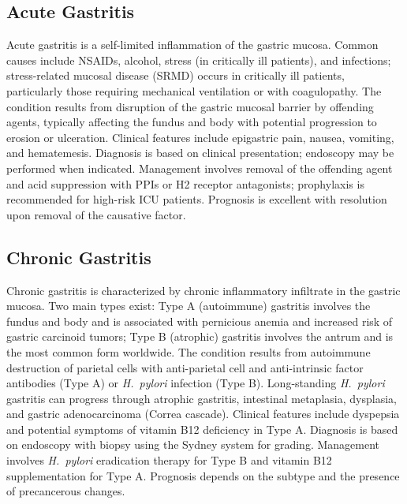 \label{sec:Gastritis}

\subsection{Acute Gastritis}
\label{sec:Acute Gastritis}
Acute gastritis is a self-limited inflammation of the gastric mucosa. Common causes include NSAIDs, alcohol, stress (in critically ill patients), and infections; stress-related mucosal disease (SRMD) occurs in critically ill patients, particularly those requiring mechanical ventilation or with coagulopathy. The condition results from disruption of the gastric mucosal barrier by offending agents, typically affecting the fundus and body with potential progression to erosion or ulceration. Clinical features include epigastric pain, nausea, vomiting, and hematemesis. Diagnosis is based on clinical presentation; endoscopy may be performed when indicated. Management involves removal of the offending agent and acid suppression with PPIs or H2 receptor antagonists; prophylaxis is recommended for high-risk ICU patients. Prognosis is excellent with resolution upon removal of the causative factor.

\subsection{Chronic Gastritis}
\label{sec:Chronic Gastritis}
Chronic gastritis is characterized by chronic inflammatory infiltrate in the gastric mucosa. Two main types exist: Type A (autoimmune) gastritis involves the fundus and body and is associated with pernicious anemia and increased risk of gastric carcinoid tumors; Type B (atrophic) gastritis involves the antrum and is the most common form worldwide. The condition results from autoimmune destruction of parietal cells with anti-parietal cell and anti-intrinsic factor antibodies (Type A) or \textit{H.~pylori} infection (Type B). Long-standing \textit{H.~pylori} gastritis can progress through atrophic gastritis, intestinal metaplasia, dysplasia, and gastric adenocarcinoma (Correa cascade). Clinical features include dyspepsia and potential symptoms of vitamin B12 deficiency in Type A. Diagnosis is based on endoscopy with biopsy using the Sydney system for grading. Management involves \textit{H.~pylori} eradication therapy for Type B and vitamin B12 supplementation for Type A. Prognosis depends on the subtype and the presence of precancerous changes.

